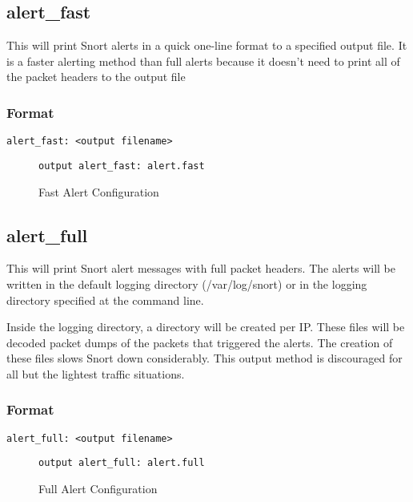\documentclass[english]{report}
\begin{document}
\subsection{alert\_fast}

This will print Snort alerts in a quick one-line format to a specified
output file. It is a faster alerting method than full alerts because
it doesn't need to print all of the packet headers to the output file


\subsubsection{Format}

\begin{verbatim}
alert_fast: <output filename>
\end{verbatim}
%
\begin{figure}[!hbpt]
\begin{verbatim}
output alert_fast: alert.fast
\end{verbatim}

\caption{\label{fast alert configuration}Fast Alert Configuration}
\end{figure}



\subsection{alert\_full}

This will print Snort alert messages with full packet headers. The alerts will
be written in the default logging directory (/var/log/snort) or in
the logging directory specified at the command line.

Inside the logging directory, a directory will be created per IP.
These files will be decoded packet dumps of the packets that triggered
the alerts. The creation of these files slows Snort down considerably.
This output method is discouraged for all but the lightest traffic
situations.


\subsubsection{Format}

\begin{verbatim}
alert_full: <output filename>
\end{verbatim}
%
\begin{figure}[!hbpt]
\begin{verbatim}
output alert_full: alert.full
\end{verbatim}

\caption{\label{full alert configuration}Full Alert Configuration}
\end{figure}
\end{document}

